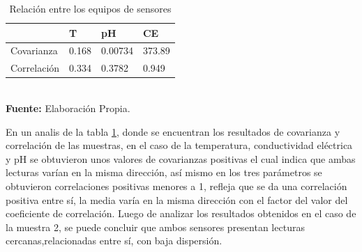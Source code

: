 \begin{table}[H]
\caption{Relaci\'on entre los equipos de sensores}
\label{tab:VaCoM2}
\centering
\begin{tabular}{llll} 
\toprule
& T   &  pH    & CE \\
\midrule
Covarianza  &0.168 & 0.00734 & 373.89        \\
Correlaci\'on & 0.334& 0.3782 & 0.949        \\
\bottomrule
\end{tabular}
\\ \textbf{Fuente: }Elaboración Propia.
\end{table} 
En un analis de la tabla \ref{tab:VaCoM2}, donde se encuentran los resultados de covarianza y correlación de las muestras, en el caso de la temperatura, conductividad el\'ectrica y pH se obtuvieron unos valores de covarianzas positivas el cual indica que ambas lecturas varían en la misma dirección, as\'i mismo en los tres par\'ametros se obtuvieron correlaciones positivas menores a 1, refleja que se da una correlación positiva entre sí, la media varía en la misma dirección con el factor del valor del coeficiente de correlación. Luego de analizar los resultados obtenidos en el caso de la muestra 2, se puede concluir que ambos sensores presentan lecturas cercanas,relacionadas entre s\'i, con baja dispersi\'on. 

